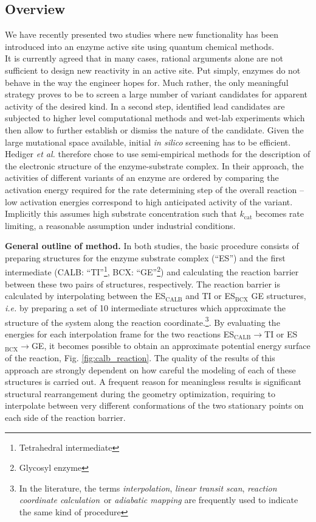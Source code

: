 \subsection{Overview}
We have recently presented two studies where new functionality has been introduced into an enzyme active site using quantum chemical methods\cite{10.1371/journal.pone.0049849,hediger2013silico,hediger2013computational}.\\
It is currently agreed that in many cases, rational arguments alone are not sufficient to design new reactivity in an active site.
Put simply, enzymes do not behave in the way the engineer hopes for.
Much rather, the only meaningful strategy proves to be to screen a large number of variant candidates for apparent activity of the desired kind.
In a second step, identified lead candidates are subjected to higher level computational methods and wet-lab experiments which then allow to further establish or dismiss the nature of the candidate.
Given the large mutational space available, initial \textit{in silico} screening has to be efficient.
Hediger \textit{et al.} therefore chose to use semi-empirical methods for the description of the electronic structure of the enzyme-substrate complex.
In their approach, the activities of different variants of an enzyme are ordered by comparing the activation energy required for the rate determining step of the overall reaction -- low activation energies correspond to high anticipated activity of the variant.
Implicitly this assumes high substrate concentration such that $k_\text{cat}$ becomes rate limiting, a reasonable assumption under industrial conditions.

\textbf{General outline of method.}
In both studies, the basic procedure consists of preparing structures for the enzyme substrate complex (``ES'') and the first intermediate (CALB: ``TI''\footnote{Tetrahedral intermediate}, BCX: ``GE''\footnote{\label{foot:ge}Glycosyl enzyme}) and calculating the reaction barrier between these two pairs of structures, respectively.
The reaction barrier is calculated by interpolating between the ES$_\text{CALB}$ and TI or ES$_\text{BCX}$ GE structures, \textit{i.e.} by preparing a set of 10 intermediate structures which approximate the structure of the system along the reaction coordinate.\footnote{In the literature, the terms \textit{interpolation}, \textit{linear transit scan}, \textit{reaction coordinate calculation} or \textit{adiabatic mapping} are frequently used to indicate the same kind of procedure}.
By evaluating the energies for each interpolation frame for the two reactions ES$_\text{CALB}\rightarrow$TI or ES$_\text{BCX}\rightarrow$GE, it becomes possible to obtain an approximate potential energy surface of the reaction, Fig. \ref{fig:calb_reaction}.
The quality of the results of this approach are strongly dependent on how careful the modeling of each of these structures is carried out.
A frequent reason for meaningless results is significant structural rearrangement during the geometry optimization, requiring to interpolate between very different conformations of the two stationary points on each side of the reaction barrier.

